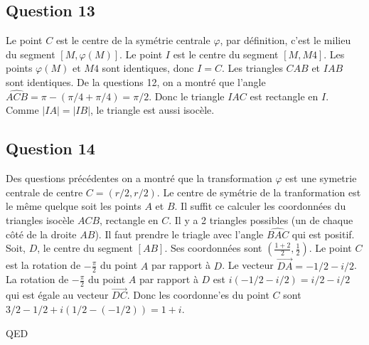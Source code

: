 \documentclass[]{book}
\theoremstyle{definition}
\begin{document}
\subsection*{Question 13}
Le point $C$ est le centre de la sym\'etrie centrale $\varphi$, par d\'efinition, c'est le milieu du segment $[M,\varphi(M)]$. Le point $I$ est le centre du segment $[M, M4]$. Les points $\varphi(M)$ et $M4$ sont identiques, donc $I=C$. Les triangles $CAB$ et $IAB$ sont identiques. De la questions 12, on a montr\'e que l'angle $\widehat{ACB} = \pi - (\pi/4+\pi/4) = \pi/2$. Donc le triangle $IAC$ est rectangle en $I$. Comme $|IA|=|IB|$, le triangle est aussi isoc\`ele. 

\subsection*{Question 14}
Des questions pr\'ec\'edentes on a montr\'e que la transformation $\varphi$ est une symetrie centrale de centre $C = (r/2, r/2)$. Le centre de sym\'etrie de la tranformation est le m\^eme quelque soit les points $A$ et $B$. Il suffit ce calculer les coordonn\'ees du triangles isoc\`ele $ACB$, rectangle en $C$. Il y a 2 triangles possibles (un de chaque c\^ot\'e de la droite $AB$). Il faut prendre le triagle avec l'angle $\widehat{BAC}$ qui est positif.\\

Soit, $D$, le centre du segment $[AB]$. Ses coordonn\'ees sont $(\frac{1+2}{2}, \frac{1}{2})$. Le point $C$ est la rotation de $-\frac{\pi}{2}$ du point $A$ par rapport \`a $D$. Le vecteur $\overrightarrow{DA} = -1/2 -i/2$. La rotation de $-\frac{\pi}{2}$ du point $A$ par rapport \`a $D$ est $i(-1/2 -i/2) = i/2 - i/2$ qui est \'egale au vecteur $\overrightarrow{DC}$. Donc les coordonne'es du point $C$ sont $3/2-1/2+i(1/2-(-1/2)) = 1 + i$.


QED
\end{document}
